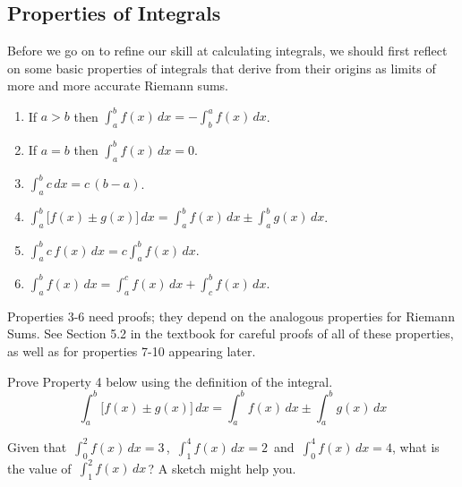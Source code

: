 

\newpage
\subsection*{Properties of Integrals}
Before we go on to refine our skill at calculating integrals, we
should first reflect on some basic properties of integrals that
derive from their origins as limits of more and more accurate
Riemann sums.

\newpage
\begin{boxnote}
\begin{enumerate}
\item If $a>b$ then $\displaystyle \int_a^bf(x)\,dx=-\int_b^af(x)\,dx$. \\[1.5ex]
\item If $a=b$ then $\displaystyle \int_a^bf(x)\,dx=0$. \\[1.5ex]
\item $\displaystyle \int_a^bc\,dx=c\,(b-a)$. \\[1.5ex]
\item $\displaystyle \int_a^b\bigl[ f(x)\pm g(x) \bigr] \,dx=\int_a^bf(x)\,dx \pm\int_a^bg(x)\,dx$. \\[1.5ex]
\item $\displaystyle \int_a^bc\,f(x)\,dx=c\int_a^bf(x)\,dx$. \\[1.5ex]
\item $\displaystyle \int_a^bf(x)\,dx=\int_a^{c}f(x)\,dx+\int_{c}^bf(x)\,dx$.
\end{enumerate}
\end{boxnote}

\newpage
\vspace{.3cm} Properties 3-6 need proofs; they depend on the analogous
properties for \mbox{Riemann} Sums.  See Section 5.2 in the textbook
for careful proofs of all of these properties, as well as for
properties 7-10 appearing later.

\newpage
\begin{problem}
Prove Property 4 below using the definition of the integral.  
\[ \int_a^b\bigl[ f(x)\pm g(x) \bigr] \,dx=\int_a^bf(x)\,dx \pm\int_a^bg(x)\,dx
\]
 
\end{problem}

\newpage

\begin{problem}
Given that $\displaystyle \,\int_{0}^{2}f(x)\,dx=3\,$, $\displaystyle \,\int_{1}^{4}f(x)\,dx = 2\,$ and 
$\displaystyle \,\int_{0}^{4}f(x)\,dx=4$, what is the value of $\displaystyle \,\int_{1}^{2}f(x)\,dx\,$? A sketch might help you.

\end{problem}

